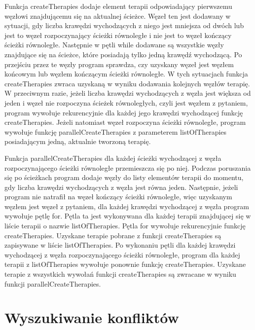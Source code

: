 \documentclass[oneside,a4paper]{book}
\begin{document}
\begin{spacing}{1.5}
Funkcja createTherapies dodaje element terapii odpowiadający pierwszemu węzłowi znajdującemu się na aktualnej ścieżce. Węzeł ten jest dodawany w sytuacji, gdy liczba krawędzi wychodzących z niego jest mniejsza od dwóch lub jest to węzeł rozpoczynający ścieżki równoległe i nie jest to węzeł kończący ścieżki równoległe. Następnie w pętli while dodawane są wszystkie węzły znajdujące się na ścieżce, które posiadają tylko jedną krawędź wychodzącą. Po przejściu przez te węzły program sprawdza, czy uzyskany węzeł jest węzłem końcowym lub węzłem kończącym ścieżki równoległe. W tych sytuacjach funkcja createTherapies zwraca uzyskaną w wyniku dodawania kolejnych węzłów terapię. W przeciwnym razie, jeżeli liczba krawędzi wychodzących z węzła jest większa od jeden i węzeł nie rozpoczyna ścieżek równoległych, czyli jest węzłem z pytaniem, program wywołuje rekurencyjnie dla każdej jego krawędzi wychodzącej funkcję createTherapies. Jeżeli natomiast węzeł rozpoczyna ścieżki równoległe, program wywołuje funkcję parallelCreateTherapies z parameterem listOfTherapies posiadającym jedną, aktualnie tworzoną terapię. 

Funkcja parallelCreateTherapies dla każdej ścieżki wychodzącej z węzła rozpoczynającego ścieżki równoległe przemieszcza się po niej. Podczas poruszania się po ścieżkach program dodaje węzły do listy elementów terapii do momentu, gdy liczba krawędzi wychodzących z węzła jest równa jeden. Następnie, jeżeli program nie natrafił na węzeł kończący ścieżki równoległe, więc uzyskanym węzłem jest węzeł z pytaniem, dla każdej krawędzi wychodzącej z węzła program wywołuje pętlę for. Pętla ta jest wykonywana dla każdej terapii znajdującej się w liście terapii o nazwie listOfTherapies. Pętla for wywołuje rekurencyjnie funkcję createTherapies. Uzyskane terapie pobrane z funkcji createTherapies są zapisywane w liście listOfTherapies. Po wykonaniu pętli dla każdej krawędzi wychodzącej z węzła rozpoczynającego ścieżki równoległe, program dla każdej terapii z listOfTherapies wywołuje ponownie funkcję createTherapies. Uzyskane terapie z wszystkich wywołań funkcji createTherapies są zwracane w wyniku funkcji parallelCreateTherapies.

\section{Wyszukiwanie konfliktów}


\end{spacing}
\end{document}
